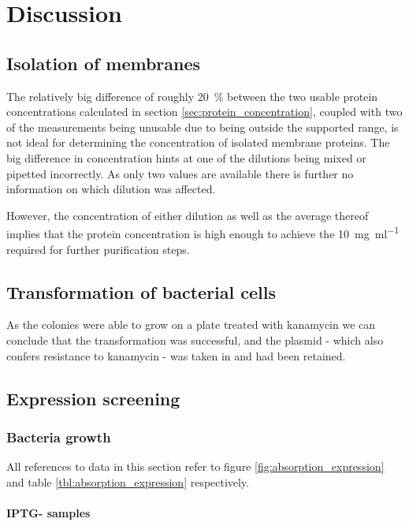 \documentclass[a4paper]{scrreprt}
\begin{document}
\chapter{Discussion}

\section{Isolation of membranes}

The relatively big difference of roughly \SI{20}{\percent} between the two
usable protein concentrations calculated in section
\ref{sec:protein_concentration}, coupled with two of the measurements being
unusable due to being outside the supported range, is not ideal for determining
the concentration of isolated membrane proteins. The big difference in
concentration hints at one of the dilutions being mixed or pipetted
incorrectly. As only two values are available there is further no information
on which dilution was affected.

However, the concentration of either dilution as well as the average thereof
implies that the protein concentration is high enough to achieve the
\SI{10}{\mg\per\ml} required for further purification steps.

\section{Transformation of bacterial cells}

As the colonies were able to grow on a plate treated with kanamycin we can
conclude that the transformation was successful, and the plasmid - which also
confers resistance to kanamycin - was taken in and had been retained.

\section{Expression screening}

\subsection{Bacteria growth}

All references to data in this section refer to figure
\ref{fig:absorption_expression} and table \ref{tbl:absorption_expression}
respectively.

\subsubsection{IPTG- samples}
\end{document}
